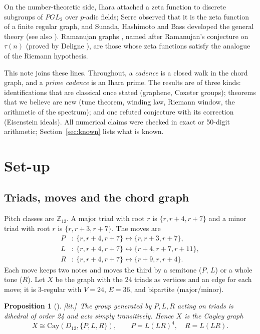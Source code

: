 \documentclass[11pt]{amsart}
\numberwithin{equation}{section}
\theoremstyle{plain}
\newtheorem{proposition}[theorem]{Proposition}
\theoremstyle{definition}\newtheorem{definition}[theorem]{Definition}
\theoremstyle{remark}\newtheorem{remark}[theorem]{Remark}
\newcommand{\Z}{\mathbb{Z}}\newcommand{\Q}{\mathbb{Q}}\newcommand{\C}{\mathbb{C}}\newcommand{\F}{\mathbb{F}}\newcommand{\R}{\mathbb{R}}
\newcommand{\ctag}[1]{\textup{\textsf{\scriptsize[#1]}}}
\begin{document}
On the number-theoretic side, Ihara \cite{ihara66} attached a zeta function to discrete subgroups of $PGL_2$ over $p$-adic fields; Serre observed that it is the zeta function of a finite regular graph, and Sunada, Hashimoto and Bass \cite{sunada86,hashimoto89,bass92} developed the general theory (see also \cite{st96,terras}). Ramanujan graphs \cite{lps88}, named after Ramanujan's conjecture on $\tau(n)$ \cite{ramanujan} (proved by Deligne \cite{deligne}), are those whose zeta functions satisfy the analogue of the Riemann hypothesis.

This note joins these lines. Throughout, a \emph{cadence} is a closed walk in the chord graph, and a \emph{prime cadence} is an Ihara prime. The results are of three kinds: identifications that are classical once stated (graphene, Coxeter groups); theorems that we believe are new (tune theorem, winding law, Riemann window, the arithmetic of the spectrum); and one refuted conjecture with its correction (Eisenstein ideals). All numerical claims were checked in exact or 50-digit arithmetic; Section~\ref{sec:known} lists what is known.

\section{Set-up}
\subsection{Triads, moves and the chord graph}
Pitch classes are $\Z_{12}$. A major triad with root $r$ is $\{r,r+4,r+7\}$ and a minor triad with root $r$ is $\{r,r+3,r+7\}$. The moves are
\begin{align*}P&:\ \{r,r+4,r+7\}\leftrightarrow\{r,r+3,r+7\},\\ L&:\ \{r,r+4,r+7\}\leftrightarrow\{r+4,r+7,r+11\},\\ R&:\ \{r,r+4,r+7\}\leftrightarrow\{r+9,r,r+4\}.\end{align*}
Each move keeps two notes and moves the third by a semitone ($P$, $L$) or a whole tone ($R$). Let $X$ be the graph with the 24 triads as vertices and an edge for each move; it is 3-regular with $V=24$, $E=36$, and bipartite (major/minor).

\begin{proposition}[\cite{cfs09}]\label{prop:cayley}
\ctag{lit.}\ The group generated by $P,L,R$ acting on triads is dihedral of order 24 and acts simply transitively. Hence $X$ is the Cayley graph
\[X\cong \mathrm{Cay}(D_{12},\{P,L,R\}),\qquad P=L(LR)^4,\quad R=L(LR).\]
\end{proposition}
\end{document}
